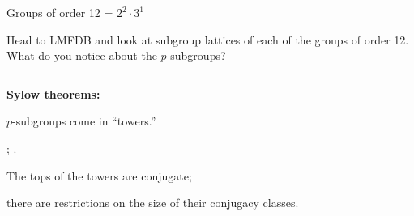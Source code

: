 \documentclass[8pt]{beamer}
\newcommand{\Pause}{\pause}      %
\begin{document}

\begin{frame}{Groups of order 12 = $2^2 \cdot 3^1$} %

  Head to LMFDB and look at subgroup lattices of each of the groups of order 12. What do you notice about the $p$-subgroups?

  \vspace{5mm} \Pause

  \begin{columns}
    \begin{column}{.5\textwidth}
      \textbf{Sylow theorems:} \bigskip

      $p$-subgroups come in ``towers.'' \bigskip

      ; . \bigskip

      The tops of the towers are conjugate;

      there are restrictions on the size of their conjugacy classes.
    \end{column}
    \begin{column}{.45\textwidth}
    \end{column}
  \end{columns}
  
  
  \vspace{-40mm}


\end{frame}
\end{document}
